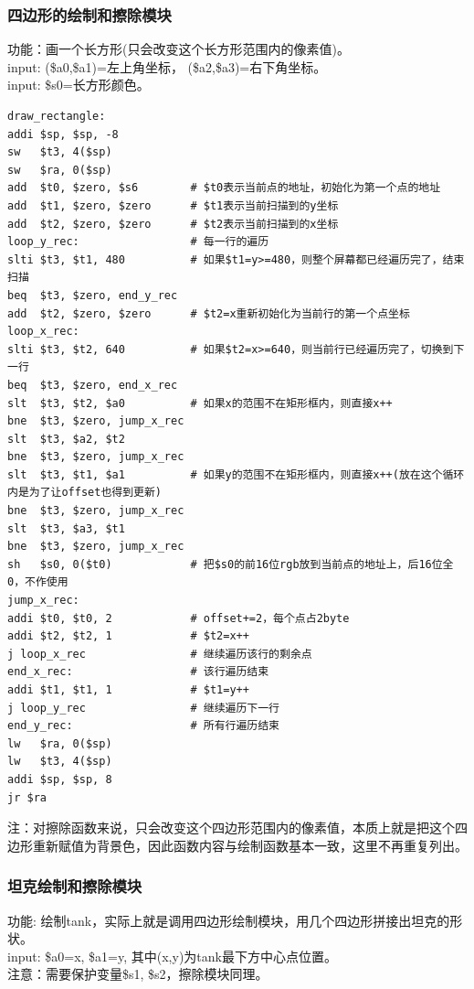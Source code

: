 \subsubsection{四边形的绘制和擦除模块}
功能：画一个长方形(只会改变这个长方形范围内的像素值)。\\
input: (\$a0,\$a1)=左上角坐标， (\$a2,\$a3)=右下角坐标。\\
input: \$s0=长方形颜色。\\

\begin{lstlisting}[frame=shadowbox]
draw_rectangle:
addi $sp, $sp, -8
sw   $t3, 4($sp)
sw   $ra, 0($sp)
add  $t0, $zero, $s6        # $t0表示当前点的地址，初始化为第一个点的地址
add  $t1, $zero, $zero      # $t1表示当前扫描到的y坐标
add  $t2, $zero, $zero      # $t2表示当前扫描到的x坐标
loop_y_rec:                 # 每一行的遍历
slti $t3, $t1, 480          # 如果$t1=y>=480，则整个屏幕都已经遍历完了，结束扫描
beq  $t3, $zero, end_y_rec        
add  $t2, $zero, $zero      # $t2=x重新初始化为当前行的第一个点坐标
loop_x_rec:  
slti $t3, $t2, 640          # 如果$t2=x>=640，则当前行已经遍历完了，切换到下一行
beq  $t3, $zero, end_x_rec
slt  $t3, $t2, $a0          # 如果x的范围不在矩形框内，则直接x++
bne  $t3, $zero, jump_x_rec
slt  $t3, $a2, $t2
bne  $t3, $zero, jump_x_rec
slt  $t3, $t1, $a1          # 如果y的范围不在矩形框内，则直接x++(放在这个循环内是为了让offset也得到更新)
bne  $t3, $zero, jump_x_rec
slt  $t3, $a3, $t1
bne  $t3, $zero, jump_x_rec
sh   $s0, 0($t0)            # 把$s0的前16位rgb放到当前点的地址上，后16位全0，不作使用
jump_x_rec:
addi $t0, $t0, 2            # offset+=2，每个点占2byte
addi $t2, $t2, 1            # $t2=x++
j loop_x_rec                # 继续遍历该行的剩余点
end_x_rec:                  # 该行遍历结束
addi $t1, $t1, 1            # $t1=y++
j loop_y_rec                # 继续遍历下一行
end_y_rec:                  # 所有行遍历结束
lw   $ra, 0($sp)
lw   $t3, 4($sp)
addi $sp, $sp, 8
jr $ra
\end{lstlisting}

注：对擦除函数来说，只会改变这个四边形范围内的像素值，本质上就是把这个四边形重新赋值为背景色，因此函数内容与绘制函数基本一致，这里不再重复列出。\\

\subsubsection{坦克绘制和擦除模块}
功能: 绘制tank，实际上就是调用四边形绘制模块，用几个四边形拼接出坦克的形状。\\
input: \$a0=x, \$a1=y, 其中(x,y)为tank最下方中心点位置。\\
注意：需要保护变量\$s1, \$s2，擦除模块同理。\\

